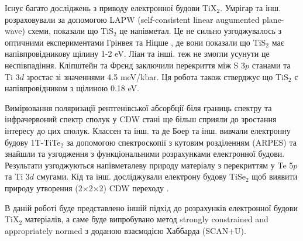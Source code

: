 Існує багато досліджень з приводу електронної будови TiX$_2$. Умрігар та інш. \cite{Benesh_1985} розраховували за допомогою LAPW (self-consistent linear augumented plane-wave) схеми, показали що TiS$_2$ це напівметал. Це не сильно узгоджувалось з оптичними експериментами Грінвея та Ніцше \cite{GREENAWAY19651445}, де вони показали що TiS$_2$ має напівпровідникову щілину 1-2 eV. Ліан та інші. \cite{Beal_1972} теж не змогли усунути це неспівпадіння. Кліпштейн та Фрєнд заключили \cite{Klipstein_1984} перекриття між S $3p$ станами та Ti $3d$ зростає зі значеннями 4.5 meV/kbar. Ця робота також стверджує що TiS$_2$ є напівпровідником з щілиною 0.18 eV. 

Вимірювання поляризації рентгенівської абсорбції біля границь спектру \cite{PhysRevB.58.7668,PhysRevB.56.3212, PhysRevB.8.3576} та інфрачервоний спектр сполук у CDW стані \cite{PhysRevB.29.2060} ще більш сприяли до зростання інтересу до цих сполук. Классен та інш. \cite{PhysRevB.54.2453} та де Боер та інш. \cite{PhysRevB.29.6797} вивчали електронну будову 1T-TiTe$_2$  за допомогою спектроскопії з кутовим розділенням (ARPES) та знайшли та узгодження з функціональними розрахунками електронної будови. Результати узгоджуються напівметалеву природу матеріалу з перекриттям у Te 5$p$ та Ti $3d$ смугами. Кід та інш. досліджували електрону будову TiSe$_2$ щоб виявити природу утворення (2$\times$2$\times$2) CDW переходу \cite{PhysRevLett.88.226402}.

В даній роботі буде представлено іншій підхід до розрахунків електронної будови TiX$_2$ матеріалів, а саме буде випробувано метод strongly constrained and appropriately normed з доданою взаємодією Хаббарда (SCAN+U). 


